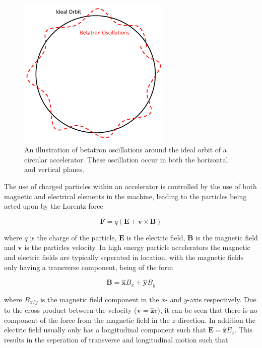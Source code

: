 \begin{figure}
\begin{center}
\includegraphics[width=0.65\textwidth]{Introduction/figures/betatron-motion.pdf}
\end{center}
\caption{An illustration of betatron oscillations around the ideal orbit of a circular accelerator. These oscillation occur in both the horizontal and vertical planes.}
\label{fig:betatron-motion}
\end{figure}

The use of charged particles within an accelerator is controlled by the use of both magnetic and electrical elements in the machine, leading to the particles being acted upon by the Lorentz force

\begin{equation}
\mathbf{F} = q \left( \mathbf{E} + \mathbf{v} \times \mathbf{B} \right)
\end{equation}

where $q$ is the charge of the particle, $\mathbf{E}$ is the electric field, $\mathbf{B}$ is the magnetic field and $\mathbf{v}$ is the particles velocity. In high energy particle accelerators the magnetic and electric fields are typically seperated in location, with the magnetic fields only having a transverse component, being of the form

\begin{equation}
\mathbf{B} = \mathbf{\hat{x}} B_{x} + \mathbf{\hat{y}} B_{y}
\end{equation}

where $B_{x/y}$ is the magnetic field component in the $x$- and $y$-axis respectively. Due to the cross product between the velocity ($\mathbf{v} = \mathbf{\hat{z}} v$), it can be seen that there is no component of the force from the magnetic field in the $z$-direction. In addition the electric field usually only has a longitudinal component such that $\mathbf{E} = \mathbf{\hat{z}} E_{z}$. This results in the seperation of transverse and longitudinal motion such that

